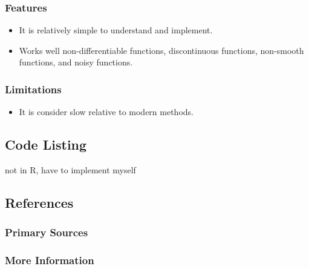 \subsubsection{Features}

\begin{itemize}
	\item It is relatively simple to understand and implement.
	\item Works well non-differentiable functions, discontinuous functions, non-smooth functions, and noisy functions.
\end{itemize}

\subsubsection{Limitations}

\begin{itemize}
	\item It is consider slow relative to modern methods.
\end{itemize}

\subsection{Code Listing}
not in R, have to implement myself


\subsection{References}

\subsubsection{Primary Sources}


\subsubsection{More Information}




